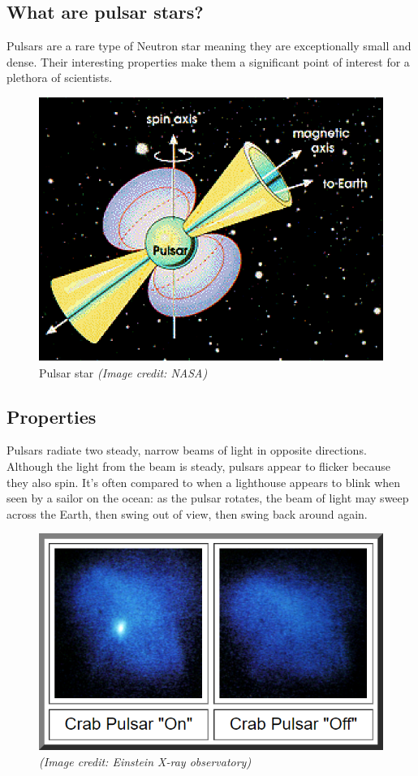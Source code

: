 \documentclass[a4paper,12pt]{article}
\begin{document}
    \subsection{What are pulsar stars?}
    Pulsars are a rare type of Neutron star meaning they are exceptionally small and dense. Their interesting properties make them a significant point of interest for a plethora of scientists.

    \begin{figure}[ht]
        \centering
        \includegraphics[scale=.85]{pulsar}
        \caption{Pulsar star \textit{(Image credit: NASA)}}
        \label{fig:pulsar}
    \end{figure}

    \newpage

    \subsection{Properties}
    Pulsars radiate two steady, narrow beams of light in opposite directions. Although the light from the beam is steady, pulsars appear to flicker because they also spin. It’s often compared to when a lighthouse appears to blink when seen by a sailor on the ocean: as the pulsar rotates, the beam of light may sweep across the Earth, then swing out of view, then swing back around again.\cite{pulsarSpace}\par

    \begin{figure}[ht]
        \centering
        \includegraphics[width=.5\textwidth]{pulsar-blink}
        \caption{\textit{(Image credit: Einstein X-ray observatory)}}
        \label{fig:blinkingpulsar}
    \end{figure}
\end{document}
